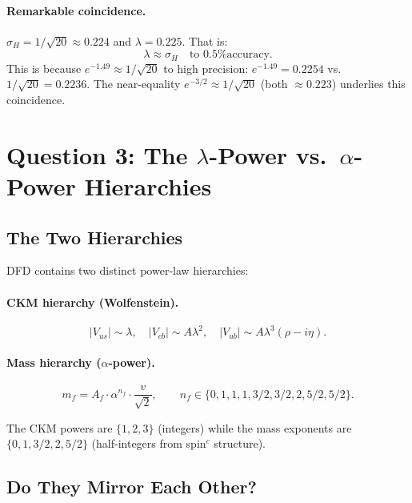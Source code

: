 \documentclass[11pt]{article}
\theoremstyle{remark}
\begin{document}
\paragraph{Remarkable coincidence.}
$\sigma_H = 1/\sqrt{20} \approx 0.224$ and $\lambda = 0.225$. That is:
\begin{equation}
\lambda \approx \sigma_H \quad \text{to 0.5\% accuracy.}
\end{equation}
This is because $e^{-1.49} \approx 1/\sqrt{20}$ to high precision:
$e^{-1.49} = 0.2254$ vs.\ $1/\sqrt{20} = 0.2236$. The near-equality
$e^{-3/2} \approx 1/\sqrt{20}$ (both $\approx 0.223$) underlies
this coincidence.

\section{Question 3: The $\lambda$-Power vs.\ $\alpha$-Power Hierarchies}
\label{sec:hierarchy}

\subsection{The Two Hierarchies}

DFD contains two distinct power-law hierarchies:

\paragraph{CKM hierarchy (Wolfenstein).}
\begin{equation}
|V_{us}| \sim \lambda, \quad
|V_{cb}| \sim A\lambda^2, \quad
|V_{ub}| \sim A\lambda^3(\rho - i\eta).
\end{equation}

\paragraph{Mass hierarchy ($\alpha$-power).}
\begin{equation}
m_f = A_f \cdot \alpha^{n_f} \cdot \frac{v}{\sqrt{2}}, \qquad
n_f \in \{0, 1, 1, 1, 3/2, 3/2, 2, 5/2, 5/2\}.
\end{equation}

The CKM powers are $\{1, 2, 3\}$ (integers) while the mass exponents
are $\{0, 1, 3/2, 2, 5/2\}$ (half-integers from spin$^c$ structure).

\subsection{Do They Mirror Each Other?}
\end{document}
